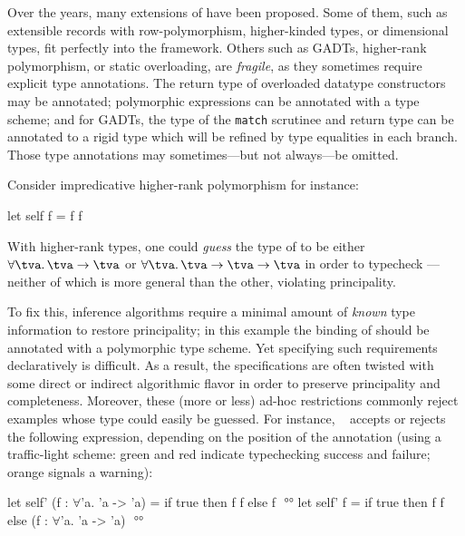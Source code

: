 \documentclass[acmsmall,screen,nonacm,review]{acmart}
\begin{document}

Over the years, many extensions of \ML have been proposed. Some of
them, such as extensible records with row-polymorphism, higher-kinded
types, or dimensional types, fit perfectly into the \ML
framework. Others such as GADTs, higher-rank polymorphism, or static
overloading, are \emph{fragile}, as they sometimes require explicit
type annotations. The return type of overloaded datatype constructors may
be annotated; polymorphic expressions can be annotated with a type
scheme; and for GADTs, the type of the \texttt{match} scrutinee and return
type can be annotated to a rigid type which will be refined by type
equalities in each branch. Those type annotations may sometimes---but
not always---be omitted.

Consider impredicative higher-rank polymorphism for instance:
\begin{program}[input]
let self f = f f
\end{program}
With higher-rank types, one could \emph{guess} the type of  to be
either $\tfor \tv \tv \to \tv$ or $\tfor \tv \tv \to \tv \to \tv$ in order
to typecheck ---neither of which is more general than the other,
violating principality.


To fix this, inference algorithms require a minimal amount of
\emph{known} type information to restore principality; in this example
the binding of  should be annotated with a polymorphic type
scheme. Yet specifying such requirements declaratively is
difficult. As a result, the specifications are often twisted with some
direct or indirect algorithmic flavor in order to preserve
principality and completeness.
%
Moreover, these (more or less) ad-hoc restrictions commonly reject examples
whose type could easily be guessed. For instance, \MLF~\citep*{LeBotlan-Remy/recasting-mlf} accepts
or rejects the following expression, depending on the position of the
annotation (using a traffic-light scheme: green and red indicate typechecking success
and failure; orange signals a warning):
\begin{program}[input]
let self' (f : $\forall$'a. 'a -> 'a) = if true then f f else f $
$   °°
let self' f = if true then f f else (f : $\forall$'a. 'a -> 'a) $
$   °°
\end{program}

\end{document}
